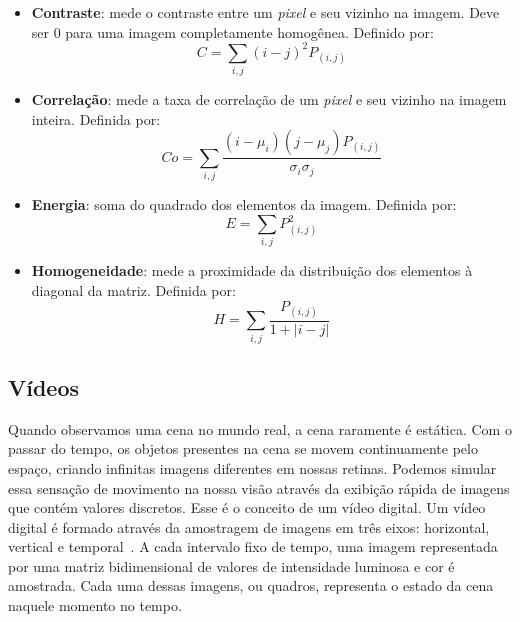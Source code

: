 \begin{itemize}

\item \textbf{Contraste}: mede o contraste entre um \textit{pixel} e seu vizinho na imagem. Deve ser 0 para uma imagem completamente homogênea. Definido por:
	\begin{equation}
		C = \sum_{i,j} (i-j)^{2}P_{(i,j)}
	\label{eq:Contraste}
	\end{equation}
	
\item \textbf{Correlação}: mede a taxa de correlação de um \textit{pixel} e seu vizinho na imagem inteira. Definida por:
	\begin{equation}
		Co = \sum_{i,j} \frac{(i - \mu_i)(j - \mu_j)P_{(i,j)}}{\sigma_i\sigma_j}
	\label{eq:Correlacao}
	\end{equation}
	
\item \textbf{Energia}: soma do quadrado dos elementos da imagem. Definida por:
	\begin{equation}
		E = \sum_{i,j} P_{(i,j)}^{2}
		\label{eq:Energia}
	\end{equation}
	
\item \textbf{Homogeneidade}: mede a proximidade da distribuição dos elementos à diagonal da matriz. Definida por:
	\begin{equation}
		H = \sum_{i,j} \frac{P_{(i,j)}}{1+|i-j|}
		\label{eq:Homo}
	\end{equation}

\end{itemize}


\subsection{Vídeos}\label{sec:video}


Quando observamos uma cena no mundo real, a cena raramente é estática. Com o passar do tempo, os objetos presentes na cena se movem continuamente pelo espaço, criando infinitas imagens diferentes em nossas retinas. Podemos simular essa sensação de movimento na nossa visão através da exibição rápida de imagens que contém valores discretos. Esse é o conceito de um vídeo digital. Um vídeo digital é formado através da amostragem de imagens	em três eixos: horizontal, vertical e temporal~\cite{LivroVideoDigital,bovik2010handbook}. A cada intervalo fixo de tempo, uma imagem representada por uma matriz bidimensional de valores de intensidade luminosa e cor é amostrada. Cada uma dessas imagens, ou quadros, representa o estado da cena naquele momento no tempo.

